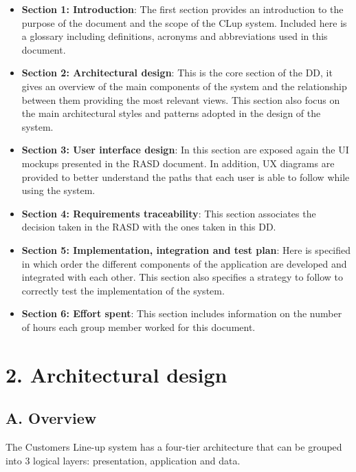 \begin{itemize}
\item 
    \textbf{Section 1: Introduction}: The first section provides an introduction to the purpose of the document and the scope of the CLup system. Included here is a glossary including definitions, acronyms and abbreviations used in this document.
\item 
    \textbf{Section 2: Architectural design}: This is the core section of the DD, it gives an overview of the main components of the system and the relationship between them providing the most relevant views. This section also focus on the main architectural styles and patterns adopted in the design of the system.
\item 
    \textbf{Section 3: User interface design}: In this section are exposed again the UI mockups presented in the RASD document. In addition, UX diagrams are provided to better understand the paths that each user is able to follow while using the system.
\item 
    \textbf{Section 4: Requirements traceability}: This section associates the decision taken in the RASD with the ones taken in this DD.
\item 
    \textbf{Section 5: Implementation, integration and test plan}: Here is specified in which order the different components of the application are developed and integrated with each other. This section also specifies a strategy to follow to correctly test the implementation of the system.
\item 
    \textbf{Section 6: Effort spent}: This section includes information on the number of hours each group member worked for this document.
\end{itemize}

\chapter{2. Architectural design}

\section{A. Overview}

The Customers Line-up system has a four-tier architecture that can be grouped into 3 logical layers: presentation, application and data.

